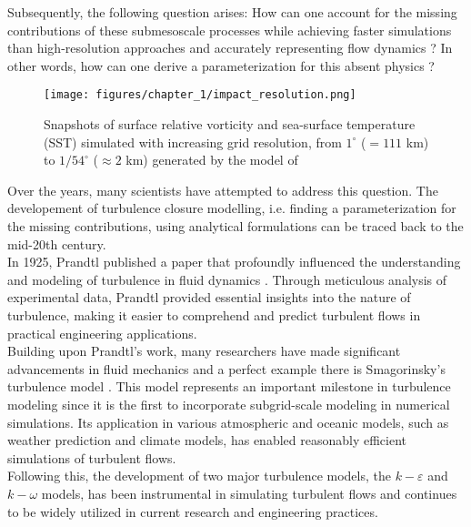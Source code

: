 \vspace{-0.42em}

Subsequently, the following question arises: How can one account for the missing contributions of these submesoscale processes while achieving faster simulations than high-resolution approaches and accurately representing flow dynamics ? In other words, how can one derive a parameterization for this absent physics ? 

\begin{figure}[!h]
    \centering
    \texttt{[image: figures/chapter\_1/impact\_resolution.png]}
    \caption{Snapshots of surface relative vorticity and sea-surface temperature (SST) simulated with increasing grid resolution, from $1 ^\circ$ ($= 111$ km) to $1/54^\circ$ ($\approx 2$ km) generated by the model of \cite{InfluenceMesoscale1}}
    \label{C1 - FIG - Impact of resolution on dynamics}
\end{figure}

\newpage

Over the years, many scientists have attempted to address this question. The developement of turbulence closure modelling, i.e. finding a parameterization for the missing contributions, using analytical formulations can be traced back to the mid-20th century.\\

In 1925, Prandtl published a paper that profoundly influenced the understanding and modeling of turbulence in fluid dynamics \citep{ClosureAnalytical1}. Through meticulous analysis of experimental data, Prandtl provided essential insights into the nature of turbulence, making it easier to comprehend and predict turbulent flows in practical engineering applications.\\

Building upon Prandtl's work, many researchers have made significant advancements in fluid mechanics and a perfect example there is Smagorinsky's turbulence model \citep{ClosureAnalytical2}. This model represents an important milestone in turbulence modeling since it is the first to incorporate subgrid-scale modeling in numerical simulations. Its application in various atmospheric and oceanic models, such as weather prediction and climate models, has enabled reasonably efficient simulations of turbulent flows.\\

Following this, the development of two major turbulence models, the $k-\varepsilon$ \citep{ClosureAnalytical3} and $k-\omega$ \citep{ClosureAnalytical4} models, has been instrumental in simulating turbulent flows and continues to be widely utilized in current research and engineering practices.\\

